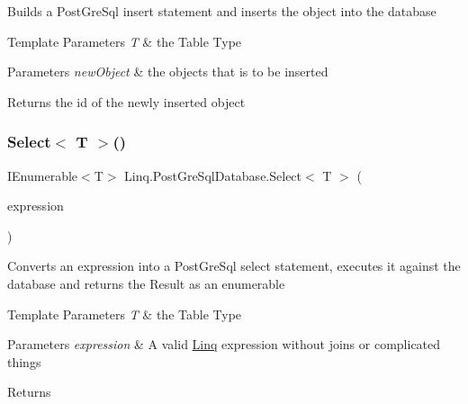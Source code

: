 Builds a Post\+Gre\+Sql insert statement and inserts the object into the database 


\begin{DoxyTemplParams}{Template Parameters}
{\em T} & the Table Type\\
\hline
\end{DoxyTemplParams}

\begin{DoxyParams}{Parameters}
{\em new\+Object} & the objects that is to be inserted\\
\hline
\end{DoxyParams}
\begin{DoxyReturn}{Returns}
the id of the newly inserted object
\end{DoxyReturn}
\mbox{\label{class_linq_1_1_post_gre_sql_database_abffcc78b1162e9b4b8bce35118edafca}} 
\subsubsection{\texorpdfstring{Select$<$ T $>$()}{Select< T >()}}
{\footnotesize\ttfamily I\+Enumerable$<$T$>$ Linq.\+Post\+Gre\+Sql\+Database.\+Select$<$ T $>$ (\begin{DoxyParamCaption}\item[{Expression}]{expression }\end{DoxyParamCaption})\hspace{0.3cm}{\ttfamily [inline]}}



Converts an expression into a Post\+Gre\+Sql select statement, executes it against the database and returns the Result as an enumerable 


\begin{DoxyTemplParams}{Template Parameters}
{\em T} & the Table Type\\
\hline
\end{DoxyTemplParams}

\begin{DoxyParams}{Parameters}
{\em expression} & A valid \mbox{\hyperlink{namespace_linq}{Linq}} expression without joins or complicated things\\
\hline
\end{DoxyParams}
\begin{DoxyReturn}{Returns}

\end{DoxyReturn}
\mbox{\label{class_linq_1_1_post_gre_sql_database_a8060f095f8b53fb22409a794bb41279d}} 
